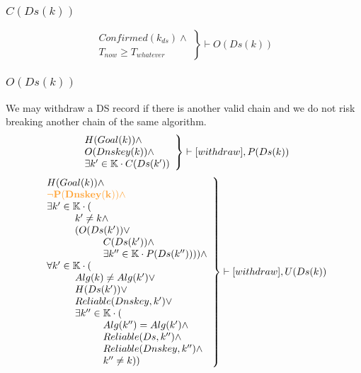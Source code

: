 \documentclass[twoside, a4paper]{article}
\newcommand{\highlightMinSig}[1]{\textcolor{MinSig}{\bf{#1}}}
\newcommand{\mathbox}[1]{#1}
\begin{document}
\subsubsection{$C(Ds(k))$}

\highlightMinSig{	\begin{equation}
		\left.
		\begin{array}{l}
			Confirmed(k_{ds}) \wedge \\
			T_{now} \geq T_{whatever}
		\end{array}
		\right\}\vdash O(Ds(k))
	\end{equation}}


\subsubsection{$O(Ds(k))$}

\mathbox{

	We may withdraw a DS record if there is another valid chain and
	we do not risk breaking another chain of the same algorithm.
\highlightMinSig{
	\begin{equation}
		\left.
		\begin{array}{l}
\hskip 0cm				H(Goal(k)) \wedge \\
\hskip 0cm				O(Dnskey(k)) \wedge \\
\hskip 0cm				\exists k' \in \mathbb{K} \cdot C(Ds(k'))\\
		\end{array}
		\right\} \vdash [withdraw], P(Ds(k)) \\
	\end{equation}
	}
	\begin{equation}
		\left.
		\begin{array}{l}
\hskip 0cm			H(Goal(k)) \wedge \\
\highlightMinSig{\hskip 0cm		\neg P(Dnskey(k)) \wedge }\\
\hskip 0cm			\exists k' \in \mathbb{K} \cdot (\\
\hskip 1cm				k' \neq k \wedge \\
\hskip 1cm				(O(Ds(k'))\vee \\
\hskip 2cm					C(Ds(k')) \wedge \\
\hskip 2cm					\exists k'' \in \mathbb{K}\cdot P(Ds(k'')))) \wedge \\
\hskip 0cm				\forall k' \in \mathbb{K} \cdot ( \\
\hskip 1cm					Alg(k) \neq Alg(k') \vee \\
\hskip 1cm					H(Ds(k')) \vee \\
\hskip 1cm					Reliable(Dnskey, k') \vee \\
\hskip 1cm					\exists k'' \in \mathbb{K} \cdot (\\
\hskip 2cm 						Alg(k'')=Alg(k') \wedge \\
\hskip 2cm 						Reliable(Ds, k'') \wedge \\
\hskip 2cm 						Reliable(Dnskey, k'') \wedge \\
\hskip 2cm 						k'' \neq k))
		\end{array}
		\right\} \vdash [withdraw], U(Ds(k)) \\
	\end{equation}
}
\end{document}
